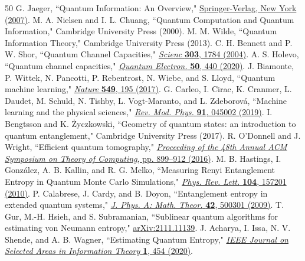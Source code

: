 \documentclass[aps,groupedaddress,superscriptaddress,amssymb,amsmath,amsbsy,amsfonts,twocolumn,pra]{revtex4}
\begin{document}
\begin{thebibliography}{50}%
%
G. Jaeger,
``Quantum Information: An Overview,"
\href{http://dx.doi.org/10.1007/978-0-387-36944-0}{
Springer-Verlag, New York (2007)}.
%
M. A. Nielsen and I. L. Chuang, 
``Quantum Computation and Quantum Information," 
Cambridge University Press (2000).
%
M. M. Wilde, 
``Quantum Information Theory," 
Cambridge University Press (2013).
%
C. H. Bennett and P. W. Shor,
``Quantum Channel Capacities," 
\href{http://dx.doi.org/10.1126/science.1092381}{
{\it Scienc} \textbf{303}, 1784 (2004)}.
%
A. S. Holevo,
``Quantum channel capacities," 
\href{http://dx.doi.org/10.1070/QEL17285}{
{\it Quantum Electron.} \textbf{50}, 440 (2020)}.
%
J. Biamonte, P. Wittek, N. Pancotti, P. Rebentrost, N. Wiebe, and S. Lloyd,
``Quantum machine learning," 
\href{http://dx.doi.org/10.1038/nature23474}{
{\it Nature} \textbf{549}, 195 (2017)}.
%
G. Carleo, I. Cirac, K. Cranmer, L. Daudet, M. Schuld, N. Tishby, L. Vogt-Maranto, and L. Zdeborov\'{a},
``Machine learning and the physical sciences," 
\href{http://dx.doi.org/10.1103/RevModPhys.91.045002}{
{\it Rev. Mod. Phys.} \textbf{91}, 045002 (2019)}.
%
I. Bengtsson and K. \.{Z}yczkowski, 
``Geometry of quantum states: an introduction to quantum entanglement," 
Cambridge University Press (2017).
%
R. O'Donnell and J. Wright,
``Efficient quantum tomography,"
\href{http://dx.doi.org/10.1145/2897518.2897544}{
{\it Proceeding of the 48th Annual ACM Symposium on Theory of Computing}, pp. 899--912 (2016)}.
%
M. B. Hastings, I. Gonz\'{a}lez, A. B. Kallin, and R. G. Melko,
``Measuring Renyi Entanglement Entropy in Quantum Monte Carlo Simulations," 
\href{http://dx.doi.org/10.1103/PhysRevLett.104.157201}{
{\it Phys. Rev. Lett.} \textbf{104}, 157201 (2010)}.
%
P. Calabrese, J. Cardy, and B. Doyon,
``Entanglement entropy in extended quantum systems," 
\href{http://dx.doi.org/10.1088/1751-8121/42/50/500301}{
{\it J. Phys. A: Math. Theor.} \textbf{42}, 500301 (2009)}.
%
T. Gur, M.-H. Hsieh, and S. Subramanian,
``Sublinear quantum algorithms for estimating von Neumann entropy,"
\href{https://doi.org/10.48550/arXiv.2111.11139}{
arXiv:2111.11139}.
%
J. Acharya, I. Issa, N. V. Shende, and A. B. Wagner,
``Estimating Quantum Entropy,"
\href{http://dx.doi.org/10.1109/JSAIT.2020.3015235}{
{\it IEEE Journal on Selected Areas in Information Theory} \textbf{1}, 454 (2020)}.
%

\end{thebibliography}
\end{document}
